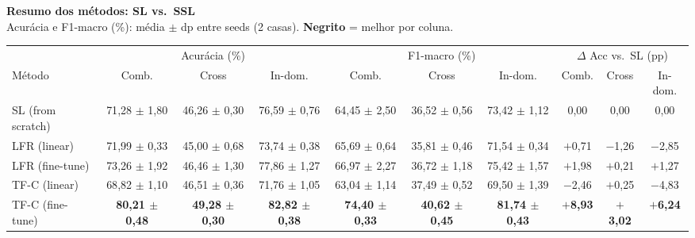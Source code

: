 \documentclass[border=8pt,varwidth=\maxdimen]{standalone}
\begin{document}
\centering
{\large\bfseries Resumo dos métodos: SL vs.\ SSL}\\[2pt]
{\small Acurácia e F1-macro (\%): média $\pm$ dp entre seeds (2 casas). \textbf{Negrito} = melhor por coluna.}\\[6pt]
\begin{tabular}{lccccccccc}
\toprule
& \multicolumn{3}{c}{Acurácia (\%)} & \multicolumn{3}{c}{F1-macro (\%)} & \multicolumn{3}{c}{$\Delta$ Acc vs.\ SL (pp)}\\
\cmidrule(lr){2-4}\cmidrule(lr){5-7}\cmidrule(lr){8-10}
Método & Comb. & Cross & In-dom. & Comb. & Cross & In-dom. & Comb. & Cross & In-dom.\\
\midrule
SL (from scratch) & 71{,}28 $\pm$ 1{,}80 & 46{,}26 $\pm$ 0{,}30 & 76{,}59 $\pm$ 0{,}76 & 64{,}45 $\pm$ 2{,}50 & 36{,}52 $\pm$ 0{,}56 & 73{,}42 $\pm$ 1{,}12 & 0{,}00 & 0{,}00 & 0{,}00\\
LFR (linear)      & 71{,}99 $\pm$ 0{,}33 & 45{,}00 $\pm$ 0{,}68 & 73{,}74 $\pm$ 0{,}38 & 65{,}69 $\pm$ 0{,}64 & 35{,}81 $\pm$ 0{,}46 & 71{,}54 $\pm$ 0{,}34 & $+$0{,}71 & $-$1{,}26 & $-$2{,}85\\
LFR (fine-tune)   & 73{,}26 $\pm$ 1{,}92 & 46{,}46 $\pm$ 1{,}30 & 77{,}86 $\pm$ 1{,}27 & 66{,}97 $\pm$ 2{,}27 & 36{,}72 $\pm$ 1{,}18 & 75{,}42 $\pm$ 1{,}57 & $+$1{,}98 & $+$0{,}21 & $+$1{,}27\\
TF-C (linear)     & 68{,}82 $\pm$ 1{,}10 & 46{,}51 $\pm$ 0{,}36 & 71{,}76 $\pm$ 1{,}05 & 63{,}04 $\pm$ 1{,}14 & 37{,}49 $\pm$ 0{,}52 & 69{,}50 $\pm$ 1{,}39 & $-$2{,}46 & $+$0{,}25 & $-$4{,}83\\
TF-C (fine-tune)  & \textbf{80{,}21 $\pm$ 0{,}48} & \textbf{49{,}28 $\pm$ 0{,}30} & \textbf{82{,}82 $\pm$ 0{,}38} & \textbf{74{,}40 $\pm$ 0{,}33} & \textbf{40{,}62 $\pm$ 0{,}45} & \textbf{81{,}74 $\pm$ 0{,}43} & \textbf{$+$8{,}93} & \textbf{$+$3{,}02} & \textbf{$+$6{,}24}\\
\bottomrule
\end{tabular}
\end{document}
